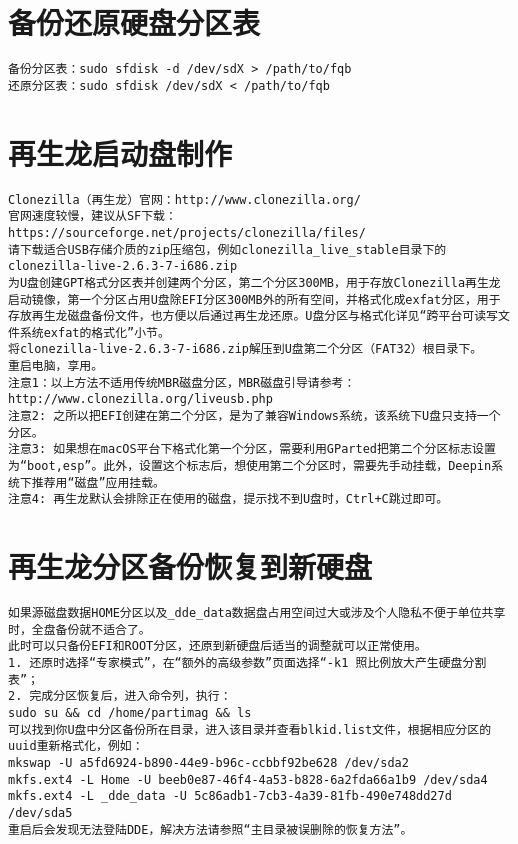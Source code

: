 \documentclass[a4paper,fontset=fandol,zihao=-4,linespread=1.2,oneside]{ctexbook}
\begin{document}
\section{备份还原硬盘分区表}
\begin{lstlisting}
备份分区表：sudo sfdisk -d /dev/sdX > /path/to/fqb
还原分区表：sudo sfdisk /dev/sdX < /path/to/fqb
\end{lstlisting}

\section{再生龙启动盘制作}
\begin{lstlisting}
Clonezilla（再生龙）官网：http://www.clonezilla.org/
官网速度较慢，建议从SF下载：https://sourceforge.net/projects/clonezilla/files/
请下载适合USB存储介质的zip压缩包，例如clonezilla_live_stable目录下的clonezilla-live-2.6.3-7-i686.zip
为U盘创建GPT格式分区表并创建两个分区，第二个分区300MB，用于存放Clonezilla再生龙启动镜像，第一个分区占用U盘除EFI分区300MB外的所有空间，并格式化成exfat分区，用于存放再生龙磁盘备份文件，也方便以后通过再生龙还原。U盘分区与格式化详见“跨平台可读写文件系统exfat的格式化”小节。
将clonezilla-live-2.6.3-7-i686.zip解压到U盘第二个分区（FAT32）根目录下。
重启电脑，享用。
注意1：以上方法不适用传统MBR磁盘分区，MBR磁盘引导请参考：http://www.clonezilla.org/liveusb.php
注意2: 之所以把EFI创建在第二个分区，是为了兼容Windows系统，该系统下U盘只支持一个分区。
注意3: 如果想在macOS平台下格式化第一个分区，需要利用GParted把第二个分区标志设置为“boot,esp”。此外，设置这个标志后，想使用第二个分区时，需要先手动挂载，Deepin系统下推荐用“磁盘”应用挂载。
注意4: 再生龙默认会排除正在使用的磁盘，提示找不到U盘时，Ctrl+C跳过即可。
\end{lstlisting}

\section{再生龙分区备份恢复到新硬盘}
\begin{lstlisting}
如果源磁盘数据HOME分区以及_dde_data数据盘占用空间过大或涉及个人隐私不便于单位共享时，全盘备份就不适合了。
此时可以只备份EFI和ROOT分区，还原到新硬盘后适当的调整就可以正常使用。
1. 还原时选择“专家模式”，在“额外的高级参数”页面选择“-k1 照比例放大产生硬盘分割表”；
2. 完成分区恢复后，进入命令列，执行：
sudo su && cd /home/partimag && ls
可以找到你U盘中分区备份所在目录，进入该目录并查看blkid.list文件，根据相应分区的uuid重新格式化，例如：
mkswap -U a5fd6924-b890-44e9-b96c-ccbbf92be628 /dev/sda2
mkfs.ext4 -L Home -U beeb0e87-46f4-4a53-b828-6a2fda66a1b9 /dev/sda4
mkfs.ext4 -L _dde_data -U 5c86adb1-7cb3-4a39-81fb-490e748dd27d /dev/sda5
重启后会发现无法登陆DDE，解决方法请参照“主目录被误删除的恢复方法”。
\end{lstlisting}
\end{document}
